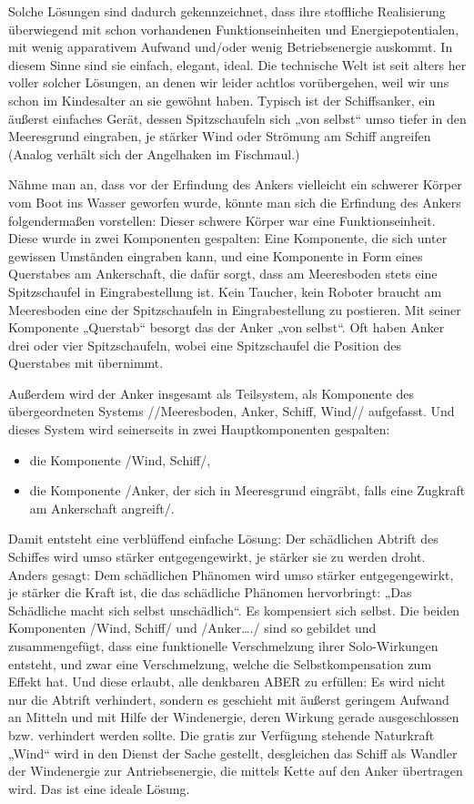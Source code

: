 \documentclass[12pt,a4paper]{article}
\begin{document}
Solche Lösungen sind dadurch gekennzeichnet, dass ihre stoffliche Realisierung
überwiegend mit schon vorhandenen Funktionseinheiten und Energiepotentialen,
mit wenig apparativem Aufwand und/oder wenig Betriebsenergie auskommt. In
diesem Sinne sind sie einfach, elegant, ideal. Die technische Welt ist seit
alters her voller solcher Lösungen, an denen wir leider achtlos vorübergehen,
weil wir uns schon im Kindesalter an sie gewöhnt haben. Typisch ist der
Schiffsanker, ein äußerst einfaches Gerät, dessen Spitzschaufeln sich „von
selbst“ umso tiefer in den Meeresgrund eingraben, je stärker Wind oder
Strömung am Schiff angreifen (Analog verhält sich der Angelhaken im
Fischmaul.)

Nähme man an, dass vor der Erfindung des Ankers vielleicht ein schwerer Körper
vom Boot ins Wasser geworfen wurde, könnte man sich die Erfindung des Ankers
folgendermaßen vorstellen: Dieser schwere Körper war eine
Funktionseinheit. Diese wurde in zwei Komponenten gespalten: Eine Komponente,
die sich unter gewissen Umständen eingraben kann, und eine Komponente in Form
eines Querstabes am Ankerschaft, die dafür sorgt, dass am Meeresboden stets
eine Spitzschaufel in Eingrabestellung ist. Kein Taucher, kein Roboter braucht
am Meeresboden eine der Spitzschaufeln in Eingrabestellung zu postieren. Mit
seiner Komponente „Querstab“ besorgt das der Anker „von selbst“. Oft haben
Anker drei oder vier Spitzschaufeln, wobei eine Spitzschaufel die Position des
Querstabes mit übernimmt.

Außerdem wird der Anker insgesamt als Teilsystem, als Komponente des
übergeordneten Systems //Meeresboden, Anker, Schiff, Wind// aufgefasst. Und
dieses System wird seinerseits in zwei Hauptkomponenten gespalten:
\begin{itemize}
\item die Komponente /Wind, Schiff/,
\item die Komponente /Anker, der sich in Meeresgrund eingräbt, falls eine
  Zugkraft am Ankerschaft angreift/.
\end{itemize}
Damit entsteht eine verblüffend einfache Lösung: Der schädlichen Abtrift des
Schiffes wird umso stärker entgegengewirkt, je stärker sie zu werden
droht. Anders gesagt: Dem schädlichen Phänomen wird umso stärker
entgegengewirkt, je stärker die Kraft ist, die das schädliche Phänomen
hervorbringt: „Das Schädliche macht sich selbst unschädlich“. Es kompensiert
sich selbst. Die beiden Komponenten /Wind, Schiff/ und /Anker…./ sind so
gebildet und zusammengefügt, dass eine funktionelle Verschmelzung ihrer
Solo-Wirkungen entsteht, und zwar eine Verschmelzung, welche die
Selbstkompensation zum Effekt hat. Und diese erlaubt, alle denkbaren ABER zu
erfüllen: Es wird nicht nur die Abtrift verhindert, sondern es geschieht mit
äußerst geringem Aufwand an Mitteln und mit Hilfe der Windenergie, deren
Wirkung gerade ausgeschlossen bzw. verhindert werden sollte. Die gratis zur
Verfügung stehende Naturkraft „Wind“ wird in den Dienst der Sache gestellt,
desgleichen das Schiff als Wandler der Windenergie zur Antriebsenergie, die
mittels Kette auf den Anker übertragen wird. Das ist eine ideale Lösung.
\end{document}
